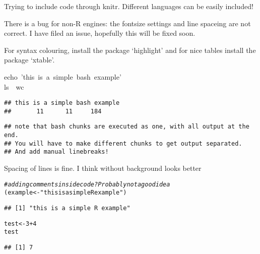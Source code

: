 \documentclass[output=inprep,
		biblatex
		]{LSP/langsci}\usepackage[]{graphicx}\usepackage[]{color}
\makeatletter
\newcommand{\hlnum}[1]{\textcolor[rgb]{0.686,0.059,0.569}{#1}}%
\newcommand{\hlstr}[1]{\textcolor[rgb]{0.192,0.494,0.8}{#1}}%
\newcommand{\hlcom}[1]{\textcolor[rgb]{0.678,0.584,0.686}{\textit{#1}}}%
\newcommand{\hlopt}[1]{\textcolor[rgb]{0,0,0}{#1}}%
\newcommand{\hlstd}[1]{\textcolor[rgb]{0.345,0.345,0.345}{#1}}%
\newcommand{\hlkwb}[1]{\textcolor[rgb]{0.69,0.353,0.396}{#1}}%
\newcommand{\hlkwc}[1]{\textcolor[rgb]{0.333,0.667,0.333}{#1}}%
\newenvironment{kframe}{%
 \def\at@end@of@kframe{}%
 \ifinner\ifhmode%
  \def\at@end@of@kframe{\end{minipage}}%
  \begin{minipage}{\columnwidth}%
 \fi\fi%
 \def\FrameCommand##1{\hskip\@totalleftmargin \hskip-\fboxsep
 \colorbox{shadecolor}{##1}\hskip-\fboxsep
     \hskip-\linewidth \hskip-\@totalleftmargin \hskip\columnwidth}%
 \MakeFramed {\advance\hsize-\width
   \@totalleftmargin\z@ \linewidth\hsize
   \@setminipage}}%
 {\par\unskip\endMakeFramed%
 \at@end@of@kframe}
\newenvironment{knitrout}{}{} %
\makeatother
\begin{document}
Trying to include code through knitr. 
Different languages can be easily 
included!

There is a bug for non-R engines: the fontsize settings and line spaceing are not correct. I have 
filed an issue, hopefully this will be fixed soon. 

For syntax colouring, install the package `highlight' and for nice tables 
install the package `xtable'.

\begin{knitrout}\footnotesize
{}\color{fgcolor}\begin{kframe}
\noindent
\ttfamily
\hlstd{}\hlkwb{echo\ }\hlstd{}\hlstr{'this\ is\ a\ simple\ bash\ example'}\hlstd{}\hspace*{\fill}\\
\hlkwc{ls\ }\hlstd{\textbar \ }\hlkwc{wc}\hlstd{}\hspace*{\fill}
\mbox{}
\normalfont

\begin{verbatim}
## this is a simple bash example
##       11      11     184
\end{verbatim}
\end{kframe}
\end{knitrout}

\begin{knitrout}\footnotesize
{}\color{fgcolor}\begin{kframe}
\begin{verbatim}
## note that bash chunks are executed as one, with all output at the end.
## You will have to make different chunks to get output separated.
## And add manual linebreaks!
\end{verbatim}
\end{kframe}
\end{knitrout}

Spacing of lines is fine. I think without background looks better

\begin{knitrout}\footnotesize
{}\color{fgcolor}\begin{kframe}
\begin{alltt}
\hlcom{# adding comments inside code? Probably not a good idea}
\hlstd{(example} \hlkwb{<-} \hlstr{"this is a simple R example"}\hlstd{)}
\end{alltt}
\begin{verbatim}
## [1] "this is a simple R example"
\end{verbatim}
\begin{alltt}

\hlstd{test} \hlkwb{<-} \hlnum{3} \hlopt{+} \hlnum{4}
\hlstd{test}
\end{alltt}
\begin{verbatim}
## [1] 7
\end{verbatim}
\end{kframe}
\end{knitrout}
\end{document}
